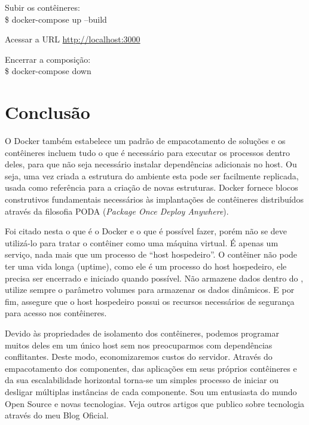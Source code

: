 \documentclass[a4paper,11pt]{article}
\begin{document}
Subir os contêineres: \\
{\ttfamily\$ docker-compose up --build}

Acessar a URL \url{http://localhost:3000}

Encerrar a composição: \\
{\ttfamily\$ docker-compose down}

\section{Conclusão}
O Docker também estabelece um padrão de empacotamento de soluções e os contêineres incluem tudo o que é necessário para executar os processos dentro deles, para que não seja necessário instalar dependências adicionais no host. Ou seja, uma vez criada a estrutura do ambiente esta pode ser facilmente replicada, usada como referência para a criação de novas estruturas. Docker fornece blocos construtivos fundamentais necessários às implantações de contêineres distribuídos através da filosofia PODA (\textit{Package Once Deploy Anywhere}).

Foi citado nesta o que é o Docker e o que é possível fazer, porém não se deve utilizá-lo para tratar o contêiner como uma máquina virtual. É apenas um serviço, nada mais que um processo de ``host hospedeiro''. O contêiner não pode ter uma vida longa (uptime), como ele é um processo do host hospedeiro, ele precisa ser encerrado e iniciado quando possível. Não armazene dados dentro do , utilize sempre o parâmetro volumes para armazenar os dados dinâmicos. E por fim, assegure que o host hospedeiro possui os recursos necessários de segurança para acesso nos contêineres.

Devido às propriedades de isolamento dos contêineres, podemos programar muitos deles em um único host sem nos preocuparmos com dependências conflitantes. Deste modo, economizaremos custos do servidor. Através do empacotamento dos componentes, das aplicações em seus próprios contêineres e da sua escalabilidade horizontal torna-se um simples processo de iniciar ou desligar múltiplas instâncias de cada componente. Sou um entusiasta do mundo Open Source e novas tecnologias. Veja outros artigos que publico sobre tecnologia através do meu Blog Oficial\cite{fernandoanselmo}.
\end{document}
